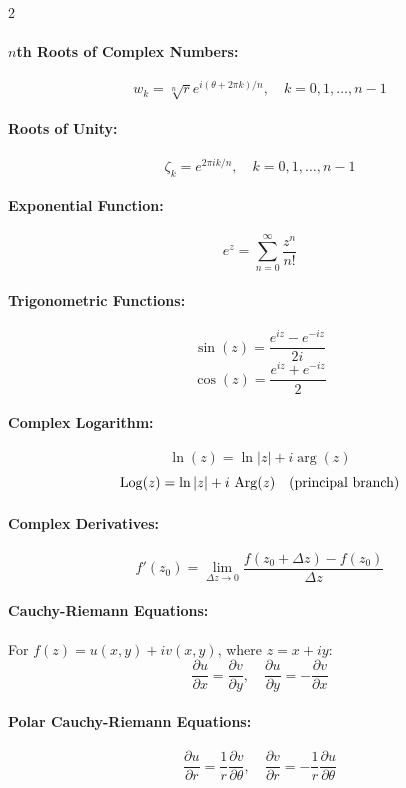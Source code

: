 \begin{multicols}{2}
\paragraph{$n$th Roots of Complex Numbers:}
\[
w_k = \sqrt[n]{r}e^{i(\theta + 2\pi k)/n}, \quad k = 0,1,\ldots,n-1
\]

\paragraph{Roots of Unity:}
\[
\zeta_k = e^{2\pi i k/n}, \quad k = 0,1,\ldots,n-1
\]

\paragraph{Exponential Function:}
\[
e^{z} = \sum_{n=0}^{\infty} \frac{z^n}{n!}
\]

\paragraph{Trigonometric Functions:}
\[
\sin(z) = \frac{e^{iz} - e^{-iz}}{2i}
\]
\[
\cos(z) = \frac{e^{iz} + e^{-iz}}{2}
\]

\paragraph{Complex Logarithm:}
\[
\ln(z) = \ln|z| + i \arg(z)
\]
\[
\operatorname{Log}(z) = \ln|z| + i\,\operatorname{Arg}(z) \quad \text{(principal branch)}
\]

\paragraph{Complex Derivatives:}
\[
f'(z_0) = \lim_{\Delta z \to 0} \frac{f(z_0 + \Delta z) - f(z_0)}{\Delta z}
\]

\paragraph{Cauchy-Riemann Equations:}
For $f(z) = u(x,y) + iv(x,y)$, where $z = x + iy$:
\[
\frac{\partial u}{\partial x} = \frac{\partial v}{\partial y}, \quad \frac{\partial u}{\partial y} = -\frac{\partial v}{\partial x}
\]

\paragraph{Polar Cauchy-Riemann Equations:}
\[
\frac{\partial u}{\partial r} = \frac{1}{r}\frac{\partial v}{\partial \theta}, \quad \frac{\partial v}{\partial r} = -\frac{1}{r}\frac{\partial u}{\partial \theta}
\]


\end{multicols}
